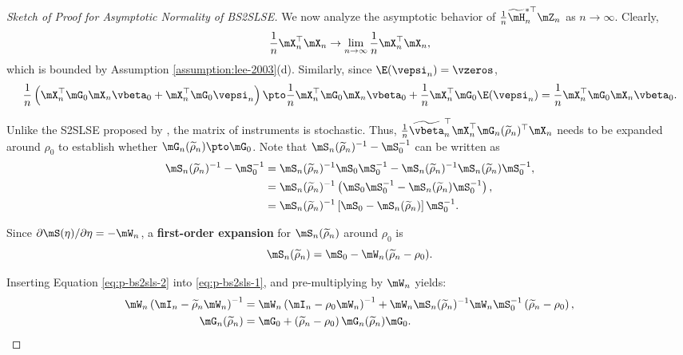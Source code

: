\begin{proof}[Sketch of Proof for Asymptotic Normality of BS2SLSE]
We now analyze the asymptotic behavior of $\frac{1}{n}\widetilde{\mH}^{*\top}_n \mZ_n$ as $n\to\infty$. Clearly, 
\begin{equation*}
 \frac{1}{n}\mX_n^\top\mX_n \to \lim_{n\to\infty}\frac{1}{n}\mX_n^\top\mX_n, 
\end{equation*}
%
which is bounded by Assumption \ref{assumption:lee-2003}(d). Similarly, since $\E(\vepsi_n) = \vzeros$,  
\begin{equation*}
\frac{1}{n}\left(\mX_n^\top\mG_0\mX_n\vbeta_0 + \mX_n^\top\mG_0\vepsi_n\right)\pto \frac{1}{n}\mX_n^\top\mG_0\mX_n\vbeta_0 + \frac{1}{n}\mX_n^\top\mG_0\E(\vepsi_n) = \frac{1}{n}\mX_n^\top\mG_0\mX_n\vbeta_0.
\end{equation*}

Unlike the S2SLSE proposed by \cite{kelejian1998generalized}, the matrix of instruments is stochastic. Thus,  $\frac{1}{n}\widetilde{\vbeta}^\top_n\mX_n^\top \mG_n(\widetilde{\rho}_n)^\top\mX_n$ needs to be expanded around $\rho_0$ to establish whether $\mG_n(\widetilde{\rho}_n)\pto \mG_0$. Note that $\mS_n(\widetilde{\rho}_n)^{-1} - \mS_0^{-1}$ can be written as
\begin{equation}\label{eq:p-bs2sls-1}
\begin{aligned}
\mS_n(\widetilde{\rho}_n)^{-1} - \mS_0^{-1} & = \mS_n(\widetilde{\rho}_n)^{-1}\mS_0\mS_0^{-1} - \mS_n(\widetilde{\rho}_n)^{-1}\mS_n(\widetilde{\rho}_n)\mS_0^{-1}, \\
    & = \mS_n(\widetilde{\rho}_n)^{-1}\left(\mS_0\mS_0^{-1} - \mS_n(\widetilde{\rho}_n)\mS_0^{-1}\right), \\
    & = \mS_n(\widetilde{\rho}_n)^{-1}\left[\mS_0 - \mS_n(\widetilde{\rho}_n)\right]\mS_0^{-1}.
\end{aligned}
\end{equation}

Since $\partial \mS(\eta) /\partial \eta = -\mW_n$, a \textbf{first-order expansion} for $\mS_n(\widetilde{\rho}_n)$ around $\rho_0$ is
\begin{equation}\label{eq:p-bs2sls-2}
\mS_n(\widetilde{\rho}_n) = \mS_0 - \mW_n(\widetilde{\rho}_n - \rho_0).
\end{equation}

Inserting Equation \eqref{eq:p-bs2sls-2} into \eqref{eq:p-bs2sls-1}, and pre-multiplying by $\mW_n$ yields:
\begin{equation*}
\begin{aligned}
\mW_n\left(\mI_n - \widetilde{\rho}_n\mW_n\right)^{-1} & = \mW_n\left(\mI_n - \rho_0\mW_n\right)^{-1} + \mW_n\mS_n(\widetilde{\rho}_n)^{-1}\mW_n\mS_0^{-1}\left(\widetilde{\rho}_n - \rho_0\right), \\
\mG_n(\widetilde{\rho}_n) & = \mG_0 + \left(\widetilde{\rho}_n - \rho_0\right)\mG_{n}(\widetilde{\rho}_n)\mG_0.
\end{aligned}
\end{equation*}


\end{proof}
